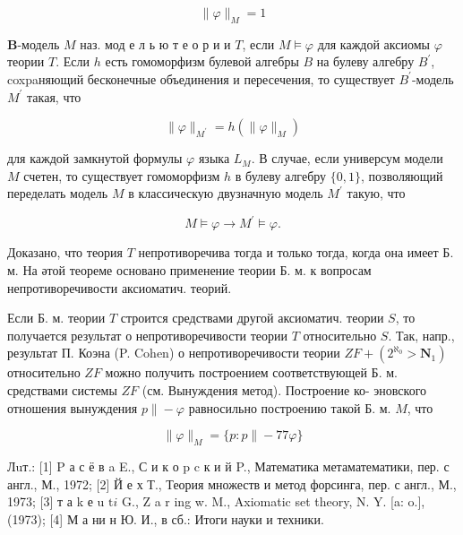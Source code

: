 \documentclass[10pt]{article}
\begin{document}
\[

\|\varphi\|_{M}=1

\]



$\boldsymbol{B}$-модель $M$ наз. мод е л ь ю т е о р и и $T$, если $M \vDash \varphi$ для каждой аксиомы $\varphi$ теории $T$. Если $h$ есть гомоморфизм булевой алгебры $B$ на булеву алгебру $B^{\prime}$, coxpaняющий бесконечные объединения и пересечения, то существует $B^{\prime}$-модель $M^{\prime}$ такая, что



\[

\|\varphi\|_{M^{\prime}}=h\left(\|\varphi\|_{M}\right)

\]



для каждой замкнутой формулы $\varphi$ языка $L_{M}$. В случае, если универсум модели $M$ счетен, то существует гомоморфизм $h$ в булеву алгебру $\{0,1\}$, позволяющий переделать модель $M$ в классическую двузначную модель $M^{\prime}$ такую, что



\[

M \vDash \varphi \rightarrow M^{\prime} \vDash \varphi .

\]



Доказано, что теория $T$ непротиворечива тогда и только тогда, когда она имеет Б. м. На әтой теореме основано применение теории Б. м. к вопросам непротиворечивости аксиоматич. теорий.



Если Б. м. теории $T$ строится средствами другой аксиоматич. теории $S$, то получается результат о непротиворечивости теории $T$ относительно $S$. Так, напр., результат П. Коэна (P. Cohen) о непротиворечивости теории $Z F+\left(2^{\aleph_{0}}>\boldsymbol{N}_{1}\right)$ относительно $Z F$ можно получить построением соответствующей Б. м. средствами системы $Z F$ (см. Вынуждения метод). Построение ко- эновского отношения вынуждения $p \|-\varphi$ равносильно построению такой Б. м. $M$, что



\[

\|\varphi\|_{M}=\{p: p \|-77 \varphi\}

\]



Лuт.: [1] P а с ё в a E., С и к о p c к и й P., Математика метаматематики, пер. с англ., М., 1972; [2] Й е х Т., Теория множеств и метод форсинга, пер. с англ., М., 1973; [3] т а k е u $\mathrm{t} i$ G., Z a r ing w. M., Axiomatic set theory, N. Y. [a: o.], (1973); [4] М а ни н Ю. И., в сб.: Итоги науки и техники.
\end{document}
